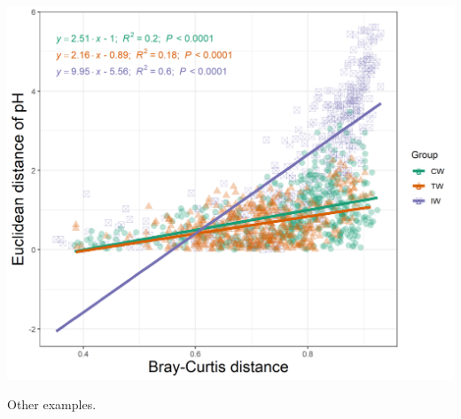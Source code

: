 \documentclass[
]{book}
\begin{document}
\begin{center}\includegraphics[width=550px]{Images/plot_scatterfit_lmgroup} \end{center}

Other examples.
\end{document}
